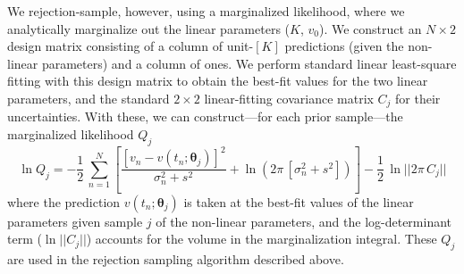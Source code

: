 \documentclass[manuscript, letterpaper]{aastex6}
\newcommand{\bs}[1]{\boldsymbol{#1}}
\begin{document}
We rejection-sample, however, using a marginalized likelihood, where we
analytically marginalize out the linear parameters ($K$, $v_0$).
We construct an $N \times 2$ design matrix consisting of a column of unit-$[K]$
predictions (given the non-linear parameters) and a column of ones.
We perform standard linear least-square fitting with this design
matrix to obtain the best-fit values for the two linear parameters,
and the standard $2\times 2$ linear-fitting covariance matrix $C_j$ for their
uncertainties.
With these, we can construct---for each prior sample---the marginalized
likelihood $Q_j$
\begin{equation}
\ln Q_j = -\frac{1}{2}\,\sum_{n=1}^N \left[\frac{[v_n - v(t_n;\bs{\theta}_j)]^2}{\sigma_n^2 + s^2}
 +\ln \left(2\pi\,[\sigma_n^2 + s^2]\right) \right] -\frac{1}{2}\,\ln ||2\pi\,C_j||
\end{equation}
where the prediction $v(t_n;\bs{\theta}_j)$ is taken at the best-fit values of
the linear parameters given sample $j$ of the non-linear parameters, and the
log-determinant term ($\ln ||C_j||$) accounts for the volume in the
marginalization integral.
These $Q_j$ are used in the rejection sampling algorithm described above.
\end{document}
